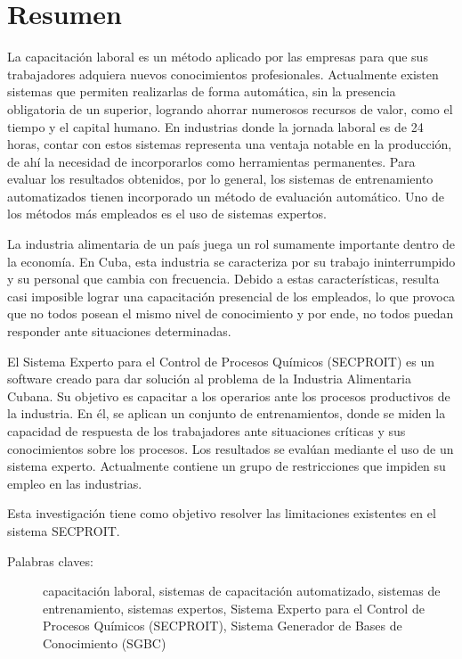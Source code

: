 \section*{Resumen}
La capacitación laboral es un método aplicado por las empresas para que sus trabajadores adquiera nuevos conocimientos profesionales. Actualmente existen sistemas que permiten realizarlas de forma automática, sin la presencia obligatoria de un superior, logrando ahorrar numerosos recursos de valor, como el tiempo y el capital humano.
En industrias donde la jornada laboral es de 24 horas, contar con estos sistemas representa una ventaja notable en la producción, de ahí la necesidad de incorporarlos como herramientas permanentes.
Para evaluar los resultados obtenidos, por lo general, los sistemas de entrenamiento automatizados tienen incorporado un método de evaluación automático. Uno de los métodos más empleados es el uso de sistemas expertos.

La industria alimentaria de un país juega un rol sumamente importante dentro de la economía. En Cuba, esta industria se caracteriza por su trabajo ininterrumpido y su personal que cambia con frecuencia. Debido a estas características, resulta casi imposible lograr una capacitación presencial de los empleados, lo que provoca que no todos posean el mismo nivel de conocimiento y por ende, no todos puedan responder ante situaciones determinadas.

El Sistema Experto para el Control de Procesos Químicos (SECPROIT) es un software creado para dar solución al problema de la Industria Alimentaria Cubana. Su objetivo es capacitar a los operarios ante los procesos productivos de la industria. En él, se aplican un conjunto de entrenamientos, donde se miden la capacidad de respuesta de los trabajadores ante situaciones críticas y sus conocimientos sobre los procesos. Los resultados se evalúan mediante el uso de un sistema experto. Actualmente contiene un grupo de restricciones que impiden su empleo en las industrias.

Esta investigación tiene como objetivo resolver las limitaciones existentes en el sistema SECPROIT.

\vfill

\begin{description}
	\item[Palabras claves:]{capacitación laboral, sistemas de capacitación automatizado, sistemas de entrenamiento, sistemas expertos, Sistema Experto para el Control de Procesos Químicos (SECPROIT), Sistema Generador de Bases de Conocimiento (SGBC)}
\end{description}


